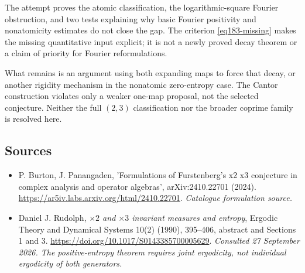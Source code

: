 \documentclass[11pt,a4paper]{article}
\numberwithin{equation}{section}
\begin{document}
The attempt proves the atomic classification, the logarithmic-square
Fourier obstruction, and two tests explaining why basic Fourier
positivity and nonatomicity estimates do not close the gap. The criterion
\eqref{eq183-missing} makes the missing quantitative input explicit; it
is not a newly proved decay theorem or a claim of priority for Fourier
reformulations.

What remains is an argument using both expanding maps to force that decay,
or another rigidity mechanism in the nonatomic zero-entropy case. The
Cantor construction violates only a weaker one-map proposal, not the
selected conjecture. Neither the full $(2,3)$ classification nor the
broader coprime family is resolved here.
\subsection{Sources}
\begin{itemize}\raggedright
\item[\textnormal{[S1]}]\hypertarget{source:183:1}{} P. Burton, J. Panangaden, 'Formulations of Furstenberg's x2 x3 conjecture in complex analysis and operator algebras', arXiv:2410.22701 (2024).
\url{https://ar5iv.labs.arxiv.org/html/2410.22701}.
{\small\textit{Catalogue formulation source.}}
\item[\textnormal{[E1]}]\hypertarget{extra:183:1}{} Daniel J. Rudolph,
\emph{$\times2$ and $\times3$ invariant measures and entropy},
Ergodic Theory and Dynamical Systems 10(2) (1990), 395--406,
abstract and Sections 1 and 3.
\url{https://doi.org/10.1017/S0143385700005629}.
{\small\textit{Consulted 27 September 2026. The positive-entropy theorem
requires joint ergodicity, not individual ergodicity of both generators.}}
\end{itemize}
\end{document}
